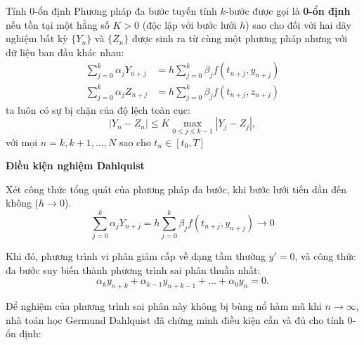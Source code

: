 \vspace{0.5em}
\begin{baitapbox}{Tính 0-ổn định}
    Phương pháp đa bước tuyến tính $k$-bước được gọi là \textbf{0-ổn định} nếu tồn tại một hằng số $K > 0$ (độc lập với bước lưới $h$) sao cho đối với hai dãy nghiệm bất kỳ $\{Y_n\}$ và $\{Z_n\}$ được sinh ra từ cùng một phương pháp nhưng với dữ liệu ban đầu khác nhau:
    \begin{align*}
        \sum_{j=0}^{k} \alpha_j Y_{n+j} &= h \sum_{j=0}^{k} \beta_j f(t_{n+j}, y_{n+j})  \\
        \sum_{j=0}^{k} \alpha_j Z_{n+j} &= h \sum_{j=0}^{k} \beta_j f(t_{n+j}, z_{n+j}) 
    \end{align*}
    \noindent ta luôn có sự bị chặn của độ lệch toàn cục:
    \begin{equation}
        |Y_n - Z_n| \le K  \max_{0 \le j \le k-1} |Y_j - Z_j| , \tag{2.15} \label{eq:2.15}
    \end{equation}
    \noindent với mọi $n = k, k+1, \dots, N$ sao cho $t_n \in [t_0, T]$
\end{baitapbox}
\vspace{0.5em}
\noindent \textbf{Điều kiện nghiệm Dahlquist}

Xét công thức tổng quát của phương pháp đa bước, khi bước lưới tiến dần đến không ($h \to 0$).
\[
 \sum_{j=0}^{k} \alpha_j Y_{n+j} = h \sum_{j=0}^{k} \beta_j f(t_{n+j}, y_{n+j}) \to 0
\]

Khi đó, phương trình vi phân giảm cấp về dạng tầm thường $y' = 0$, và công thức đa bước suy biến thành phương trình sai phân thuần nhất:
\[
    \alpha_k y_{n+k} + \alpha_{k-1} y_{n+k-1} + \dots + \alpha_0 y_n = 0.
\]

Để nghiệm của phương trình sai phân này không bị bùng nổ hàm mũ khi $n \to \infty$, nhà toán học Germund Dahlquist đã chứng minh điều kiện cần và đủ cho tính 0-ổn định:

